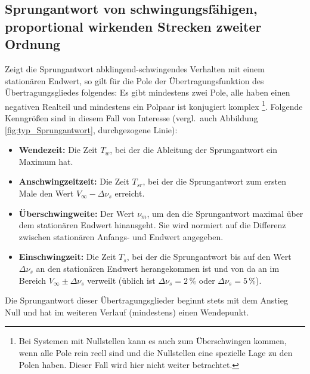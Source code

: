 \subsection{Sprungantwort von schwingungsfähigen, proportional wirkenden Strecken zweiter Ordnung} \label{sec:pt_2-glied-schw}
Zeigt die Sprungantwort abklingend-schwingendes Verhalten mit einem stationären Endwert, so gilt für die Pole der Übertragungsfunktion des Übertragungsgliedes folgendes: Es gibt mindestens zwei Pole, alle haben einen negativen Realteil und mindestens ein Polpaar ist konjugiert komplex
\footnote{Bei Systemen mit Nullstellen kann es auch zum Überschwingen kommen, wenn alle Pole rein reell sind und die Nullstellen eine spezielle Lage zu den Polen haben. Dieser Fall wird hier nicht weiter betrachtet.}.
Folgende Kenngrößen sind in diesem Fall von Interesse (vergl.~auch Abbildung \ref{fig:typ_Sprungantwort}, durchgezogene Linie):
\begin{itemize}
    \item \textbf{Wendezeit:} Die Zeit $T_w$, bei der die Ableitung der Sprungantwort ein Maximum hat.
    \item \textbf{Anschwingzeitzeit:} Die Zeit $T_{sr}$, bei der die Sprungantwort zum ersten Male  den Wert $V_\infty - \Delta \nu_s$ erreicht.
    \item \textbf{Überschwingweite:} Der Wert $\nu_m$, um den die Sprungantwort maximal über dem stationären Endwert hinausgeht. Sie wird normiert auf die Differenz zwischen stationären Anfangs- und Endwert angegeben.
    \item \textbf{Einschwingzeit:} Die Zeit $T_{s}$, bei der die Sprungantwort bis auf den Wert $\Delta \nu_s$ an den stationären Endwert herangekommen ist und von da an im Bereich $V_\infty \pm \Delta \nu_s$ verweilt (üblich ist $\Delta \nu_s = 2\,\%$ oder $\Delta \nu_s = 5\,\%$).
\end{itemize}
Die Sprungantwort dieser Übertragungsglieder beginnt stets mit dem Anstieg Null und hat im weiteren Verlauf (mindestens) einen Wendepunkt.
